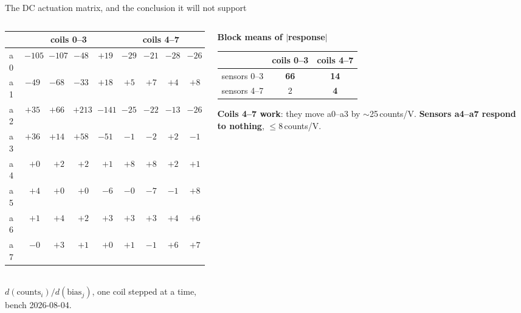 \documentclass[aspectratio=169]{beamer}
\begin{document}
\begin{frame}{The DC actuation matrix, and the conclusion it will not support}
  \begin{columns}[T]
    \begin{column}{0.55\textwidth}
      \centering
      {\scriptsize\setlength{\tabcolsep}{3pt}
      \begin{tabular}{@{}lrrrr|rrrr@{}}
        \toprule
        & \multicolumn{4}{c|}{coils 0--3} & \multicolumn{4}{c}{coils 4--7} \\
        \midrule
        a0 & $-105$ & $-107$ & $-48$ & $+19$ & $-29$ & $-21$ & $-28$ & $-26$ \\
        a1 & $-49$ & $-68$ & $-33$ & $+18$ & $+5$ & $+7$ & $+4$ & $+8$ \\
        a2 & $+35$ & $+66$ & $+213$ & $-141$ & $-25$ & $-22$ & $-13$ & $-26$ \\
        a3 & $+36$ & $+14$ & $+58$ & $-51$ & $-1$ & $-2$ & $+2$ & $-1$ \\
        \midrule
        a4 & $+0$ & $+2$ & $+2$ & $+1$ & $+8$ & $+8$ & $+2$ & $+1$ \\
        a5 & $+4$ & $+0$ & $+0$ & $-6$ & $-0$ & $-7$ & $-1$ & $+8$ \\
        a6 & $+1$ & $+4$ & $+2$ & $+3$ & $+3$ & $+3$ & $+4$ & $+6$ \\
        a7 & $-0$ & $+3$ & $+1$ & $+0$ & $+1$ & $-1$ & $+6$ & $+7$ \\
        \bottomrule
      \end{tabular}}\\
      {\scriptsize $d(\text{counts}_i)/d(\text{bias}_j)$, one coil stepped at a
      time, bench 2026-08-04.}
    \end{column}
    \begin{column}{0.43\textwidth}
      \centering
      {\footnotesize \textbf{Block means of $|$response$|$}}\\[1mm]
      {\footnotesize
      \begin{tabular}{@{}lcc@{}}
        \toprule
        & coils 0--3 & coils 4--7 \\
        \midrule
        sensors 0--3 & \textbf{66} & \textbf{14} \\
        sensors 4--7 & 2 & \textbf{4} \\
        \bottomrule
      \end{tabular}}

      \vspace{2mm}
      \scriptsize
      \raggedright
      \textbf{Coils 4--7 work}: they move a0--a3 by $\sim$25\,counts/V.
      \textbf{Sensors a4--a7 respond to nothing}, $\leq 8$\,counts/V.


\end{column}
\end{columns}
\end{frame}
\end{document}
